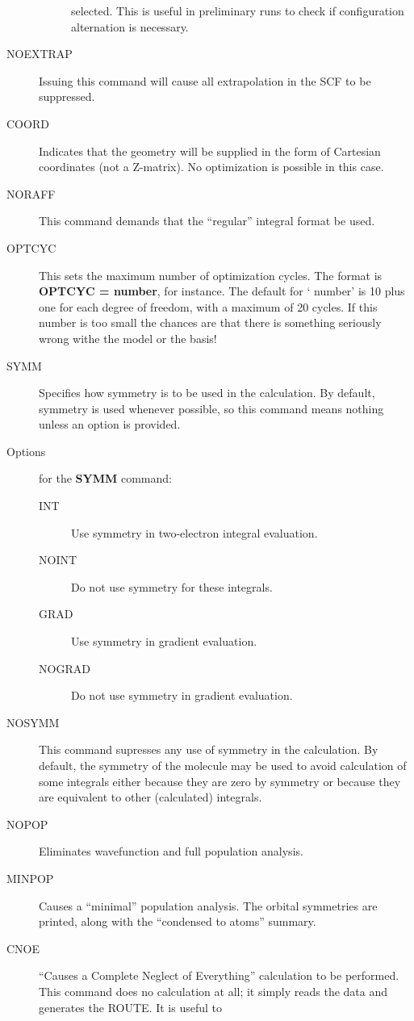 \begin{description}
\begin{description}
selected. This is useful in preliminary runs to check if
configuration alternation is necessary.
\end{description}
\item[NOEXTRAP] Issuing this command will cause all extrapolation in the
SCF to be suppressed.
\item[COORD]  Indicates that the geometry will be supplied in the form of
Cartesian coordinates (not a Z-matrix). No optimization is possible in this
case.
\item[NORAFF]  This command demands that the ``regular'' 
integral format  be used.
\item[OPTCYC]  This sets the maximum number of optimization cycles. The
format is {\bf OPTCYC = number}, for instance.
The default for ` number' is 10 plus one for each degree of freedom,
with a maximum of 20 cycles. If this number is too small the chances
are that there is something seriously wrong withe the model or the
basis!
\item[SYMM]  Specifies how symmetry is to be used in the calculation. By
default, symmetry is used whenever possible, so this command
means nothing unless an option is provided.
\item[Options] for the {\bf SYMM} command:
\begin{description}
\item[INT] Use symmetry in two-electron integral evaluation.
\item[NOINT] Do not use symmetry for these integrals.
\item[GRAD] Use symmetry in gradient evaluation.
\item[NOGRAD] Do not use symmetry in gradient evaluation.
\end{description}
\item[NOSYMM] This command supresses any use of symmetry 
in the calculation.  By
default, the symmetry of the molecule may be used to avoid
calculation of some integrals either because they are zero by symmetry
or because they are equivalent to other (calculated) integrals.
\item[NOPOP]   Eliminates wavefunction and full population analysis.
\item[MINPOP] Causes a ``minimal'' population analysis. The orbital
symmetries are printed, along with the 
``condensed to atoms'' summary.
\item[CNOE] ``Causes a Complete Neglect of Everything'' 
calculation to be performed. This command does no calculation at all;
it simply reads the data and generates the ROUTE. It is useful to

\end{description}
